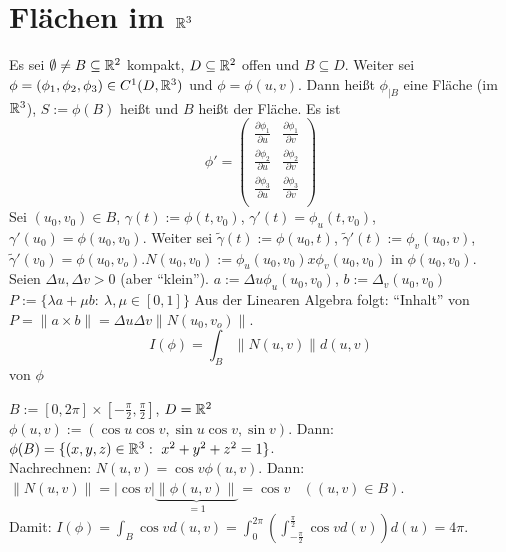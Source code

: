 \documentclass[a4paper,twoside,DIV15,BCOR12mm,chapterprefix=true,headings=onelinechapter]{scrbook}
\begin{document}
\chapter{Flächen im $\mathbb{R}^3$}
\begin{definition}
	Es sei $\emptyset \ne B\subseteq \mathbb{R}^2$ kompakt, $D\subseteq\mathbb{R}^2$ offen und $B\subseteq D$. Weiter sei $\phi = (\phi_1,\phi_2,\phi_3) \in C^1(D,\mathbb{R}^3)$ und $\phi = \phi(u,v)$. Dann heißt $\phi_{|B}$ eine Fläche (im $\mathbb{R}^3$), $S:= \phi(B)$ heißt  und $B$ heißt  der Fläche. Es ist 
	\begin{displaymath}
		\phi' = \begin{pmatrix}\frac{\partial \phi_1}{\partial u} & \frac{\partial\phi_1}{\partial v}\\
			\frac{\partial \phi_2}{\partial u} & \frac{\partial\phi_2}{\partial v}\\
			\frac{\partial \phi_3}{\partial u} & \frac{\partial\phi_3}{\partial v}\\
		\end{pmatrix}
	\end{displaymath}
	Sei $(u_0,v_0)\in B$, $\gamma(t) := \phi(t,v_0)$, $\gamma'(t) = \phi_u(t,v_0)$, $\gamma'(u_0) = \phi(u_0,v_0)$. Weiter sei $\tilde{\gamma}(t):= \phi(u_0,t)$, $\tilde{\gamma}'(t) := \phi_v(u_0,v)$, $\tilde{\gamma}'(v_0) = \phi(u_0,v_o)$.$N(u_0,v_0) := \phi_u(u_0,v_0)x\phi_v(u_0,v_0)$  in $\phi(u_0,v_0)$. \\
	Seien $\Delta u,\Delta v >0$ (aber "`klein"'). $a:= \Delta u\phi_u(u_0,v_0)$, $b:= \Delta_v(u_0,v_0)$\\ $P:= \{\lambda a+\mu b: \ \lambda,\mu\in [0,1]\}$ Aus der Linearen Algebra folgt: "`Inhalt"' von $P = \|a \times b\| = \Delta u\Delta v \|N(u_0,v_o)\|$.
	\begin{displaymath}
		I(\phi) = \int_B \|N(u,v)\| d(u,v)
	\end{displaymath}
	 von $\phi$
\end{definition}

\begin{beispiel}
	$B:=[0,2\pi]\times[-\frac\pi2,\frac\pi2]$, $D=\mathbb{R}^2$\\
	$\phi(u,v) := (\cos u\cos v,\sin u\cos v,\sin v)$. Dann: $\phi(B) = \{(x,y,z)\in\MdR^3:\ x^2+y^2+z^2 = 1\}$.\\
	Nachrechnen: $N(u,v) = \cos v\phi(u,v)$. Dann: $\|N(u,v)\| = |\cos v|\underbrace{\|\phi(u,v)\|}_{=1} = \cos v\ \ \ \ ((u,v)\in B)$. \\
	Damit: $I(\phi) = \int_B \cos v d(u,v) = \int_0^{2\pi} (\int_{-\frac\pi2}^{\frac\pi2}\cos v d(v)) d(u) = 4\pi$.
\end{beispiel}
\end{document}
